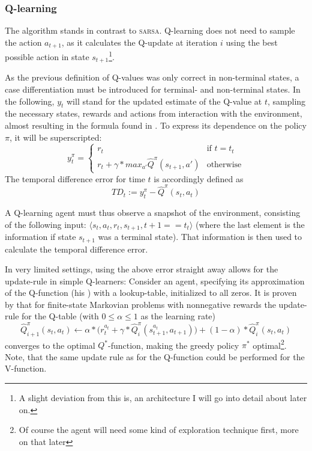 \subsubsection*{Q-learning}

The  algorithm \cite{watkins_learning_1989} stands in contrast to \textsc{sarsa}. Q-learning does not need to sample the action $a_{t+1}$, as it calculates the Q-update at iteration $i$ using the best possible action in state $s_{t+1}$\footnote{A slight deviation from this is, an architecture I will go into detail about later on.}. 

As the previous definition of Q-values was only correct in non-terminal states, a case differentiation must be introduced for terminal- and non-terminal states. In the following, $y_t$ will stand for the updated estimate of the Q-value at $t$, sampling the necessary states, rewards and actions from interaction with the environment, almost resulting in the formula found in \cite{mnih_human-level_2015}. To express its dependence on the policy $\pi$, it will be superscripted:
\begin{equation} \label{eq:ycases}
	y_t^\pi = \begin{cases} 
		r_t & \text{if } t = t_t\\
		r_t + \gamma * max_{a'} \hat{Q}^\pi( s_{t+1}, a') & \text{otherwise}
\end{cases}
\end{equation}
The temporal difference error for time $t$ is accordingly defined as 
\begin{equation}
TD_t := y_t^\pi - \hat{Q}^\pi(s_t, a_t)
\end{equation}

A Q-learning agent must thus observe a snapshot of the environment, consisting of the following input: $\langle s_t, a_t, r_t, s_{t+1}, t+1==t_t \rangle$ (where the last element is the information if state $s_{t+1}$ was a terminal state). That information is then used to calculate the temporal difference error.

In very limited settings, using the above error straight away allows for the update-rule in simple Q-learners: Consider an agent, specifying its approximation of the Q-function (his ) with a lookup-table, initialized to all zeros. It is proven by \cite{watkins_technical_1992} that for finite-state Markovian problems with nonnegative rewards the update-rule for the Q-table (with $0 \leq \alpha \leq 1$ as the learning rate)
\begin{equation} \label{eq:qtable}
	\hat{Q}^\pi_{i+1}(s_t,a_t) \leftarrow \alpha * \Big(r_t^{a_t} + \gamma * \hat{Q}^\pi_i(s_{t+1}^{a_t},a_{t+1}) \Big) + (1-\alpha) * \hat{Q}^\pi_i(s_t,a_t)
\end{equation}
converges to the optimal $Q^*$-function, making the greedy policy $\pi^*$ optimal\footnote{Of course the agent will need some kind of exploration technique first, more on that later}. Note, that the same update rule as for the Q-function could be performed for the V-function.\\

